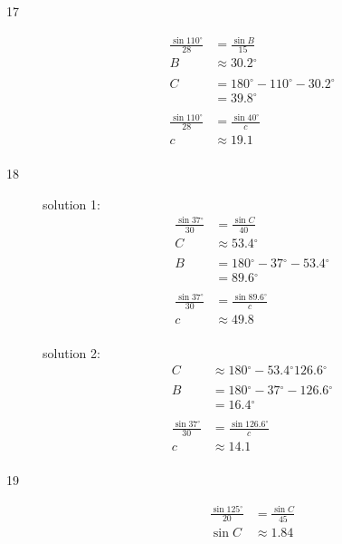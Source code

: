 \documentclass{exam}
\newcommand{\dg}{\ensuremath{^\circ}}
\begin{document}
\begin{description}
      \item[17] 
        \begin{align*}
          \frac{\sin 110 \dg}{28} & = \frac{\sin B}{15} \\
          B                       & \approx \boxed{ 30.2 \dg } \\
          \\
          C & = 180 \dg - 110 \dg - 30.2 \dg \\
            & = \boxed{ 39.8 \dg } \\
          \\
          \frac{\sin 110 \dg}{28} & = \frac{\sin 40 \dg}{c} \\
          c                       & \approx \boxed{ 19.1 } \\
        \end{align*}

      \item[18] 
        solution 1:
        \begin{align*}
          \frac{\sin 37 \dg}{30} & = \frac{\sin C}{40} \\
          C                      & \approx \boxed{ 53.4 \dg } \\
          \\
          B & = 180 \dg - 37 \dg - 53.4 \dg \\
            & = \boxed{ 89.6 \dg } \\
          \\
          \frac{\sin 37 \dg}{30} & = \frac{\sin 89.6 \dg}{c} \\
          c                      & \approx \boxed{ 49.8 } \\
        \end{align*}

        solution 2:
        \begin{align*}
          C & \approx 180 \dg - 53.4 \dg \boxed{ 126.6 \dg } \\
          \\
          B & = 180 \dg - 37 \dg - 126.6 \dg \\
            & = \boxed{ 16.4 \dg } \\
          \\
          \frac{\sin 37 \dg}{30} & = \frac{\sin 126.6 \dg}{c} \\
          c                      & \approx \boxed{ 14.1 } \\
        \end{align*}

      \item[19] 
        \begin{align*}
          \frac{\sin 125 \dg}{20} & = \frac{\sin C}{45} \\
          \sin C                  & \approx 1.84 \\
        \end{align*}


\end{description}
\end{document}
